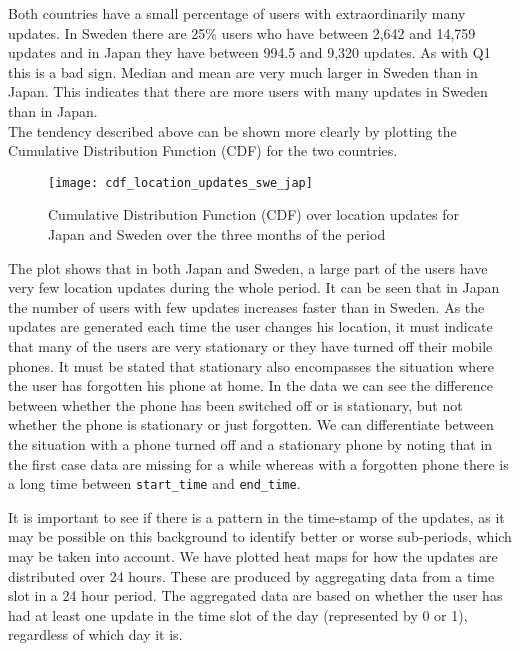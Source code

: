 Both countries have a small percentage of users with extraordinarily many updates. In Sweden there are 25\% users who have between 2,642 and 14,759 updates and in Japan they have between 994.5 and 9,320 updates. As with Q1 this is a bad sign.
Median and mean are very much larger in Sweden than in Japan. This indicates that there are more users with many updates in Sweden than in Japan.  \\

The tendency described above can be shown more clearly by plotting the Cumulative Distribution Function (CDF) for the two countries.  
 
\begin{figure}[H]
    \hspace*{-1.0cm}
    \centering
    \texttt{[image: cdf\_location\_updates\_swe\_jap]}
    \caption{Cumulative Distribution Function (CDF) over location updates for Japan and Sweden over the three months of the period}
    \label{fig:country_cdf}
\end{figure}

The plot shows that in both Japan and Sweden, a large part of the users have very few location updates during the whole period. It can be seen that in Japan the number of users with few updates increases faster than in Sweden.  
As the updates are generated each time the user changes his location, it must indicate that many of the users are very stationary or they have turned off their mobile phones. It must be stated that stationary also encompasses the situation where the user has forgotten his phone at home. In the data we can see the difference between whether the phone has been switched off or is stationary, but not whether the phone is stationary or just forgotten. We can differentiate between the situation with a phone turned off and a stationary phone by noting that in the first case data are missing for a while whereas with a forgotten phone there is a long time between \texttt{start\_time} and \texttt{end\_time}.  

It is important to see if there is a pattern in the time-stamp of the updates, as it may be possible on this background to identify better or worse sub-periods, which may be taken into account. 
We have plotted heat maps for how the updates are distributed over 24 hours. These are produced by aggregating data from a time slot in a 24 hour period. The aggregated data are based on whether the user has had at least one update in the time slot of the day (represented by 0 or 1), regardless of which day it is. 

